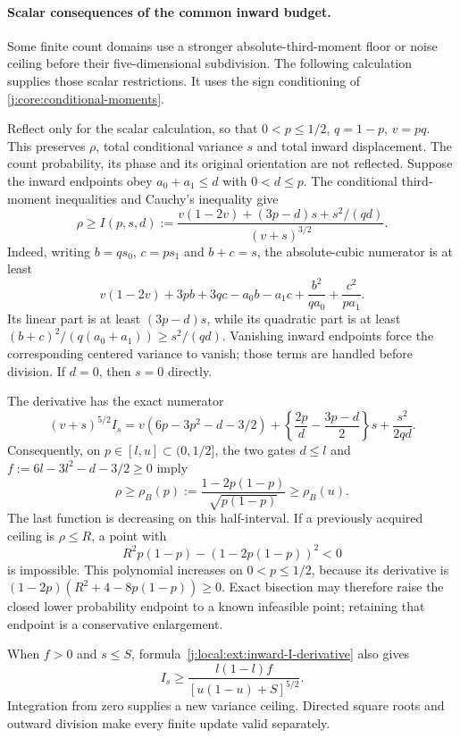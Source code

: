 \paragraph{Scalar consequences of the common inward budget.}
\label{j:local:ext:inward-scalar}
Some finite count domains use a stronger absolute-third-moment floor or
noise ceiling before their five-dimensional subdivision. The following
calculation supplies those scalar restrictions. It uses the sign
conditioning of \eqref{j:core:conditional-moments}.

Reflect only for the scalar calculation, so that
$0<p\le1/2$, $q=1-p$, $v=pq$. This preserves $\rho$, total
conditional variance $s$ and total inward displacement. The count
probability, its phase and its original orientation are not reflected.
Suppose the inward endpoints obey $a_0+a_1\le d$ with $0<d\le p$.
The conditional third-moment inequalities and Cauchy's inequality give
\begin{equation}\label{j:local:ext:inward-I}
 \rho\ge I(p,s,d):=
 \frac{v(1-2v)+(3p-d)s+s^2/(qd)}{(v+s)^{3/2}}.
\end{equation}
Indeed, writing $b=qs_0$, $c=ps_1$ and $b+c=s$, the absolute-cubic
numerator is at least
\[
 v(1-2v)+3pb+3qc-a_0b-a_1c
                       +\frac{b^2}{qa_0}+\frac{c^2}{pa_1}.
\]
Its linear part is at least $(3p-d)s$, while its quadratic part is
at least $(b+c)^2/(q(a_0+a_1))\ge s^2/(qd)$.
Vanishing inward endpoints force the corresponding centered variance
to vanish; those terms are handled before division. If $d=0$, then
$s=0$ directly.

The derivative has the exact numerator
\begin{equation}\label{j:local:ext:inward-I-derivative}
 (v+s)^{5/2}I_s
 =v(6p-3p^2-d-3/2)
   +\left\{\frac{2p}{d}-\frac{3p-d}{2}\right\}s
   +\frac{s^2}{2qd}.
\end{equation}
Consequently, on $p\in[l,u]\subset(0,1/2]$, the two gates
$d\le l$ and $f:=6l-3l^2-d-3/2\ge0$ imply
\[
 \rho\ge\rho_B(p):=\frac{1-2p(1-p)}{\sqrt{p(1-p)}}
                  \ge\rho_B(u).
\]
The last function is decreasing on this half-interval. If a previously
acquired ceiling is $\rho\le R$, a point with
\[
 R^2p(1-p)-(1-2p(1-p))^2<0
\]
is impossible. This polynomial increases on $0<p\le1/2$, because
its derivative is $(1-2p)(R^2+4-8p(1-p))\ge0$.
Exact bisection may therefore raise the closed lower probability
endpoint to a known infeasible point; retaining that endpoint is a
conservative enlargement.

When $f>0$ and $s\le S$, formula~\eqref{j:local:ext:inward-I-derivative}
also gives
\[
 I_s\ge
 \frac{l(1-l)f}{[u(1-u)+S]^{5/2}}.
\]
Integration from zero supplies a new variance ceiling. Directed square
roots and outward division make every finite update valid separately.

